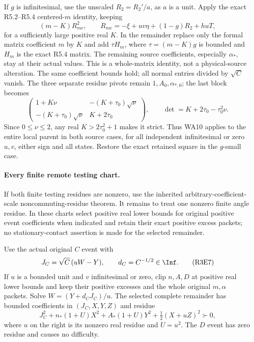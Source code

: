 If $g$ is infinitesimal, use the unscaled $R_2=R_2'/a$, as $a$
is a unit. Apply the exact R5.2--R5.4 centered-$m$ identity, keeping
\[
 (m-K)R_{mc}^2,\qquad
 R_{mc}=-\xi+uv\eta+(1-g)R_2+huT,
\]
for a sufficiently large positive real $K$. In the remainder
replace only the formal matrix coefficient $m$ by $K$ and add
$\tau H_m$, where $\tau=(m-K)g$ is bounded and $H_m$ is the exact
R5.4 matrix. The remaining source coefficients, especially
$\alpha_*$, stay at their actual values. This is a whole-matrix
identity, not a physical-source alteration. The same coefficient
bounds hold; all normal entries divided by $\sqrt C$ vanish.
The three separate residue pivots remain $1,A_0,\alpha_{*,0}$;
the last block becomes
\[
 \begin{pmatrix}
 1+K\nu&-(K+\tau_0)\sqrt\nu\\
 -(K+\tau_0)\sqrt\nu&K+2\tau_0
 \end{pmatrix},\qquad
 \det=K+2\tau_0-\tau_0^2\nu.                       \tag{R3E6}
\]
Since $0\le\nu\le2$, any real $K>2\tau_0^2+1$ makes it strict.
Thus WA10 applies to the entire local parent in both source cases,
for all independent infinitesimal or zero $u,v$, either sign and
all states. Restore the exact retained square in the $g$-small case.

\paragraph{Every finite remote testing chart.}
If both finite testing residues are nonzero, use the inherited
arbitrary-coefficient-scale noncommuting-residue theorem. It remains
to treat one nonzero finite angle residue. In these charts select
positive real lower bounds for original positive event coefficients
when indicated and retain their exact positive excess packets;
no stationary-contact assertion is made for the selected remainder.

Use the actual original $C$ event with
\[
       J_C=\sqrt C\,(uW-Y),\qquad d_C=C^{-1/2}\in\Inf.
                                                               \tag{R3E7}
\]
If $u$ is a bounded unit and $v$ infinitesimal or zero, clip $n,A,D$
at positive real lower bounds and keep their positive excesses and
the whole original $m,\alpha$ packets. Solve
$W=(Y+d_CJ_C)/u$. The selected complete remainder has bounded
coefficients in $(J_C,X,Y,Z)$ and residue
\[
 J_C^2+n_*(1+U)X^2+A_*(1+U)Y^2
                         +\tfrac12(X+uZ)^2\succ0,               \tag{R3E8}
\]
where $u$ on the right is its nonzero real residue and $U=u^2$.
The $D$ event has zero residue and causes no difficulty.

